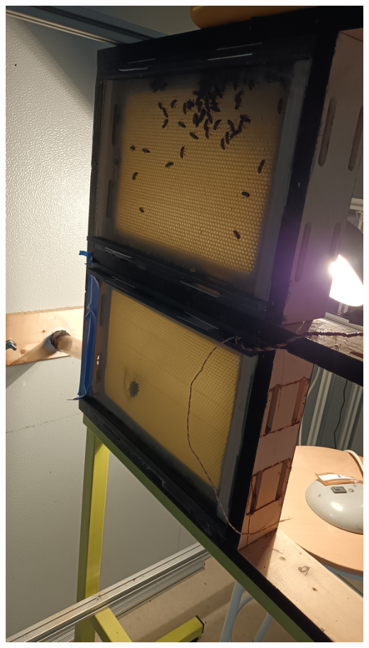 \documentclass[11pt,french,a4paper]{article}
\begin{document}
\begin{center}
    \includegraphics[scale=0.1,angle=270]{../img/RC.png}
    \label{RC}
\end{center}
\end{document}
